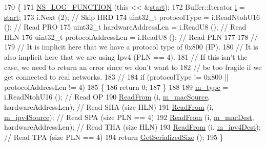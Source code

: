 \begin{DoxyCode}
170 \{
171   \hyperlink{log-macros-disabled_8h_a90b90d5bad1f39cb1b64923ea94c0761}{NS\_LOG\_FUNCTION} (\textcolor{keyword}{this} << &\hyperlink{namespacevisualizer_1_1core_a2a35e5d8a34af358b508dac8635754e0}{start});
172   Buffer::Iterator \hyperlink{bernuolliDistribution_8m_a6f6ccfcf58b31cb6412107d9d5281426}{i} = \hyperlink{namespacevisualizer_1_1core_a2a35e5d8a34af358b508dac8635754e0}{start};
173   i.Next (2);                                    \textcolor{comment}{// Skip HRD}
174   uint32\_t protocolType = i.ReadNtohU16 ();      \textcolor{comment}{// Read PRO}
175   uint32\_t hardwareAddressLen = i.ReadU8 ();     \textcolor{comment}{// Read HLN}
176   uint32\_t protocolAddressLen = i.ReadU8 ();     \textcolor{comment}{// Read PLN}
177 
178   \textcolor{comment}{//}
179   \textcolor{comment}{// It is implicit here that we have a protocol type of 0x800 (IP).}
180   \textcolor{comment}{// It is also implicit here that we are using Ipv4 (PLN == 4).}
181   \textcolor{comment}{// If this isn't the case, we need to return an error since we don't want to }
182   \textcolor{comment}{// be too fragile if we get connected to real networks.}
183   \textcolor{comment}{//}
184   \textcolor{keywordflow}{if} (protocolType != 0x800 || protocolAddressLen != 4)
185     \{
186       \textcolor{keywordflow}{return} 0;
187     \}
188 
189   \hyperlink{classns3_1_1ArpHeader_a8b5d651b2153bd85714a376df62e93e0}{m\_type} = i.ReadNtohU16 ();                     \textcolor{comment}{// Read OP}
190   \hyperlink{namespacens3_aeeba9f1570f031f9e401f76f51943805}{ReadFrom} (i, \hyperlink{classns3_1_1ArpHeader_a203567d8a9119ebb3d8f572627711467}{m\_macSource}, hardwareAddressLen); \textcolor{comment}{// Read SHA (size HLN)}
191   \hyperlink{namespacens3_aeeba9f1570f031f9e401f76f51943805}{ReadFrom} (i, \hyperlink{classns3_1_1ArpHeader_aedf1d03e058ebff6ffdbcbe01582e4a5}{m\_ipv4Source});                    \textcolor{comment}{// Read SPA (size PLN == 4)}
192   \hyperlink{namespacens3_aeeba9f1570f031f9e401f76f51943805}{ReadFrom} (i, \hyperlink{classns3_1_1ArpHeader_ab30b05ca3579eab9ec112456a5d8fed9}{m\_macDest}, hardwareAddressLen);   \textcolor{comment}{// Read THA (size HLN)}
193   \hyperlink{namespacens3_aeeba9f1570f031f9e401f76f51943805}{ReadFrom} (i, \hyperlink{classns3_1_1ArpHeader_acaf790c20dd771889204740c70c7fdc0}{m\_ipv4Dest});                      \textcolor{comment}{// Read TPA (size PLN == 4)}
194   \textcolor{keywordflow}{return} \hyperlink{classns3_1_1ArpHeader_a49ef082e7372e63ed828561bf51da92e}{GetSerializedSize} ();
195 \}
\end{DoxyCode}


